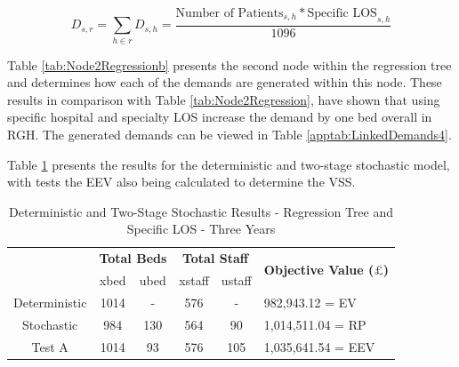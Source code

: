 \documentclass[../thesis.tex]{subfiles}
\begin{document}
\begin{equation}\label{eq:treedemand4}
        D_{s,r} = \sum\limits_{h \in r} D_{s,h} = \frac{\text{Number of Patients}_{s,h}*{\text{Specific LOS}_{s,h}}}{1096}
\end{equation}

Table \ref{tab:Node2Regressionb} presents the second node within the regression tree and determines how each of the demands are generated within this node. These results in comparison with Table \ref{tab:Node2Regression}, have shown that using specific hospital and specialty LOS increase the demand by one bed overall in RGH. The generated demands can be viewed in Table \ref{apptab:LinkedDemands4}.

\begin{table}[h!]
    \centering{}
    \caption{Regression Tree Node 2 - Specific LOS}
    \label{tab:Node2Regressionb}
\end{table}

Table \ref{tab:Results4} presents the results for the deterministic and two-stage stochastic model, with tests the EEV also being calculated to determine the VSS.

\begin{table}[h!]
    \centering
    \begin{tabular}{cccccl}\toprule
 & \multicolumn{2}{l}{\textbf{Total Beds}} & \multicolumn{2}{c}{\textbf{Total Staff}} & \multirow{2}{*}{\textbf{Objective Value ($\pounds$)}}\\ \cmidrule(lr){2-3} \cmidrule(lr){4-5}
 & xbed           & ubed          & xstaff         & ustaff         \\ \midrule
    Deterministic      & 1014 & - & 576 & - & 982,943.12 = EV \\ \midrule
    Stochastic &984& 130& 564 & 90&  1,014,511.04 = RP \\ \midrule
    Test A & 1014 & 93 & 576 & 105 & 1,035,641.54 = EEV \\\bottomrule
    \end{tabular}
    \caption{Deterministic and Two-Stage Stochastic Results - Regression Tree and Specific LOS - Three Years}
    \label{tab:Results4}
\end{table}
\end{document}
